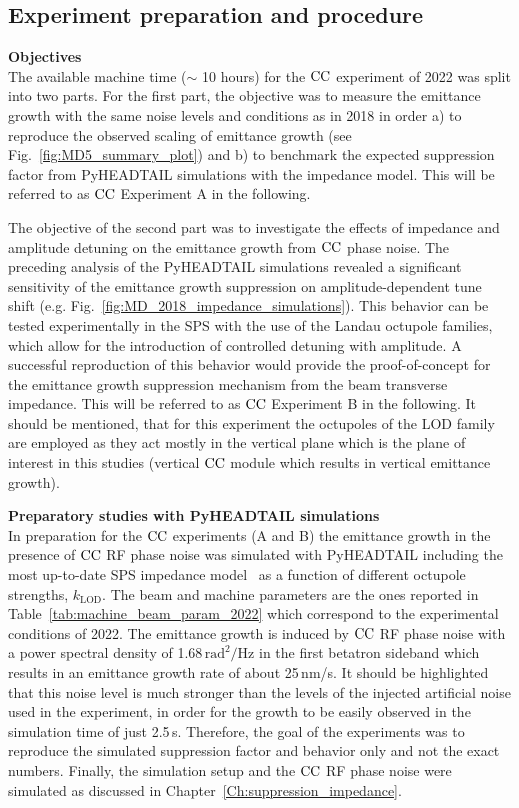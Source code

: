 \subsection{Experiment preparation and procedure}\label{sec:cc_md_2022_preparation}
\textbf{Objectives}\\
The available machine time ($\sim$ 10 hours) for the ${\mathrm{CC}}$ experiment of 2022 was split into two parts. For the first part, the objective was to measure the emittance growth with the same noise levels and conditions as in 2018 in order a) to reproduce the observed scaling of emittance growth (see Fig.~\ref{fig:MD5_summary_plot}) and b) to benchmark the expected suppression factor from PyHEADTAIL simulations with the impedance model. This will be referred to as ${\mathrm{CC}}$ Experiment A in the following.

The objective of the second part was to investigate the effects of impedance and amplitude detuning on the emittance growth from ${\mathrm{CC}}$ phase noise. The preceding analysis of the PyHEADTAIL simulations revealed a significant sensitivity of the emittance growth suppression on amplitude-dependent tune shift (e.g. Fig.~\ref{fig:MD_2018_impedance_simulations}). This behavior can be tested experimentally in the SPS with the use of the Landau octupole families, which allow for the introduction of controlled detuning with amplitude. A successful reproduction of this behavior would provide the proof-of-concept for the emittance growth suppression mechanism from the beam transverse impedance. This will be referred to as ${\mathrm{CC}}$ Experiment B in the following. It should be mentioned, that for this experiment the octupoles of the LOD family are employed as they act mostly in the vertical plane which is the plane of interest in this studies (vertical ${\mathrm{CC}}$ module which results in vertical emittance growth).

\textbf{Preparatory studies with PyHEADTAIL simulations}\\
In preparation for the ${\mathrm{CC}}$ experiments (A and B) the emittance growth in the presence of ${\mathrm{CC}}$ RF phase noise was simulated with PyHEADTAIL including the most up-to-date SPS impedance model~\cite{updated_sps_wakfields_model} as a function of different octupole strengths, $k_{\mathrm{LOD}}$. The beam and machine parameters are the ones reported in Table~\ref{tab:machine_beam_param_2022} which correspond to the experimental conditions of 2022. The emittance growth is induced by ${\mathrm{CC}}$ RF phase noise with a power spectral density of 1.68\,$\mathrm{rad^2/Hz}$ in the first betatron sideband which results in an emittance growth rate of about 25\,nm/s. It should be highlighted that this noise level is much stronger than the levels of the injected artificial noise used in the experiment, in order for the growth to be easily observed in the simulation time of just 2.5\,s. Therefore, the goal of the experiments was to reproduce the simulated suppression factor and behavior only and not the exact numbers. Finally, the simulation setup and the ${\mathrm{CC}}$ RF phase noise were simulated as discussed in Chapter~\ref{Ch:suppression_impedance}. 

